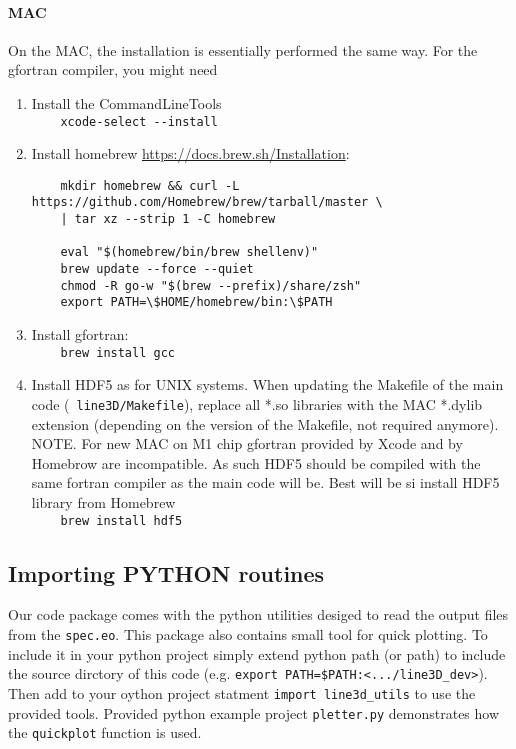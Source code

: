 \documentclass[10pt,a4paper]{article}
\begin{document}
\paragraph{MAC}
On the MAC, the installation is essentially performed the same way. For the gfortran compiler, you might need
\begin{enumerate}
\item Install the CommandLineTools \\
  \verb|    xcode-select --install|
\item Install homebrew \href{https://docs.brew.sh/Installation}{https://docs.brew.sh/Installation}:\\
  \begin{verbatim}
    mkdir homebrew && curl -L https://github.com/Homebrew/brew/tarball/master \
    | tar xz --strip 1 -C homebrew 

    eval "$(homebrew/bin/brew shellenv)"
    brew update --force --quiet
    chmod -R go-w "$(brew --prefix)/share/zsh"
    export PATH=\$HOME/homebrew/bin:\$PATH
  \end{verbatim}
\item Install gfortran:\\
  \verb|    brew install gcc|
\item Install HDF5 as for UNIX systems. When updating the Makefile of
  the main code (\eg~\verb|line3D/Makefile|), replace all *.so libraries with
  the MAC *.dylib extension (depending on the version of the Makefile, not required anymore).\\
  {\color{red} NOTE. For new MAC on M1 chip gfortran provided by Xcode and by Homebrow are incompatible.
  As such HDF5 should be compiled with the same fortran compiler as the main code will be.
  Best will be si install HDF5 library from Homebrew 
  \\
  \verb|    brew install hdf5|}
\end{enumerate}

\subsection{Importing PYTHON routines}
Our code package comes with the python utilities desiged to read the output files from the \texttt{spec.eo}. 
This package also contains small tool for quick plotting. 
To include it in your python project simply extend python path (or path) 
to include the source dirctory of this code (e.g. \verb|export PATH=$PATH:<.../line3D_dev>|).
Then add to your oython project statment \verb|import line3d_utils| to use the provided tools. 
Provided python example project \texttt{pletter.py} demonstrates how the \texttt{quickplot} function is used.
\end{document}
